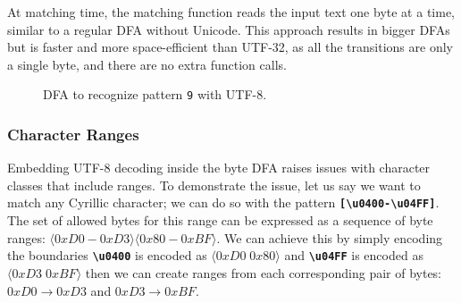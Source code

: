 At matching time, the matching function reads the input text one byte at a time, similar to a regular DFA without Unicode. This approach results in bigger DFAs but is faster and more space-efficient than UTF-32, as all the transitions are only a single byte, and there are no extra function calls.

\begin{figure}[htbp]
\centering
\begin{adjustbox}{width=1.1\textwidth,center=\textwidth}
\end{adjustbox}
\caption{DFA to recognize pattern \texttt{9\textvisiblespace \textsterling} with UTF-8.}
\label{fig:utf8exdfa}
\end{figure}


\subsubsection{Character Ranges}
Embedding UTF-8 decoding inside the byte DFA raises issues with character classes that include ranges. To demonstrate the issue, let us say we want to match any Cyrillic character; we can do so with the pattern \texttt{\textbf{[\textbackslash u0400-\textbackslash u04FF]}}. The set of allowed bytes for this range can be expressed as a sequence of byte ranges: $\langle0xD0-0xD3\rangle \langle0x80-0xBF\rangle$. We can achieve this by simply encoding the boundaries \texttt{\textbf{\textbackslash u0400}} is encoded as $\langle0xD0 \; 0x80\rangle$ and \texttt{\textbf{\textbackslash u04FF}} is encoded as $\langle0xD3 \; 0xBF\rangle$ then we can create ranges from each corresponding pair of bytes: $0xD0 \rightarrow 0xD3$ and $0xD3 \rightarrow 0xBF$.

